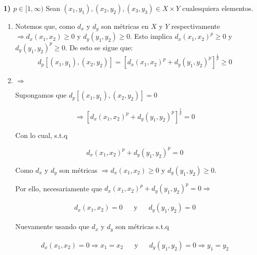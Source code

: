 \begin{proofexplanation}
    \textcolor{ForestGreen!70!black}{\textbf{1) $p \in [1,\infty)$}} Sean $(x_1,y_1), (x_2,y_2), (x_3,y_3) \in X \times Y$ cualesquiera elementos.

    \begin{enumerate}[label=(\subscript{D}{{\arabic*}})]
    \item Notemos que, como ${d}_{x}$ y ${d}_{y}$ son métricas en $X$ y $Y$ respectivamente $\Rightarrow {d}_{x}{({x}_{1},{x}_{2})} \geqslant 0$ y ${d}_{y}{({y}_{1},{y}_{2})} \geqslant 0$. Esto implica $ {d}_{x}{({x}_{1},{x}_{2})}^{p} \geqslant 0$ y ${d}_{y}{({y}_{1},{y}_{2})}^{p} \geqslant 0$. De esto se sigue que:
    \begin{equation*}
         {d}_{p}[({x}_{1},{y}_{1}), ({x}_{2},{y}_{2})] = {[{d}_{x}{({x}_{1},{x}_{2})}^{p}+{d}_{y}{({y}_{1},{y}_{2})}^{p}]}^{\frac{1}{p}} \geqslant 0
    \end{equation*}
    \item $\Rightarrow$ 
    
    Supongamos que ${d}_{p}[({x}_{1},{y}_{1}), ({x}_{2},{y}_{2})] = 0$

    \begin{equation*}
        \Rightarrow {[{d}_{x}{({x}_{1},{x}_{2})}^{p}+{d}_{y}{({y}_{1},{y}_{2})}^{p}]}^{\frac{1}{p}} = 0
    \end{equation*}

    Con lo cual, s.t.q 

    \begin{equation*}
        {d}_{x}{({x}_{1},{x}_{2})}^{p}+{d}_{y}{({y}_{1},{y}_{2})}^{p} = 0
    \end{equation*}
    
    Como ${d}_{x}$ y ${d}_{y}$ son métricas $\Rightarrow {d}_{x}{({x}_{1},{x}_{2})} \geqslant 0$ y ${d}_{y}{({y}_{1},{y}_{2})} \geqslant 0$.

    Por ello, necesariamente que ${d}_{x}{({x}_{1},{x}_{2})}^{p}+{d}_{y}{({y}_{1},{y}_{2})}^{p} = 0 \Rightarrow$

        \begin{align*}
        {d}_{x}{({x}_{1},{x}_{2})} = 0 & & \text{y} & & {d}_{y}{({y}_{1},{y}_{2})} = 0
        \end{align*}

        Nuevamente usando que $d_x$ y $d_y$ son métricas s.t.q 
        
        \begin{align*}
        {d}_{x}{({x}_{1},{x}_{2})} = 0 \Rightarrow x_1 = x_2 & & \text{y} & & {d}_{y}{({y}_{1},{y}_{2})} = 0 \Rightarrow y_1 = y_2
        \end{align*}


\end{enumerate}
\end{proofexplanation}
